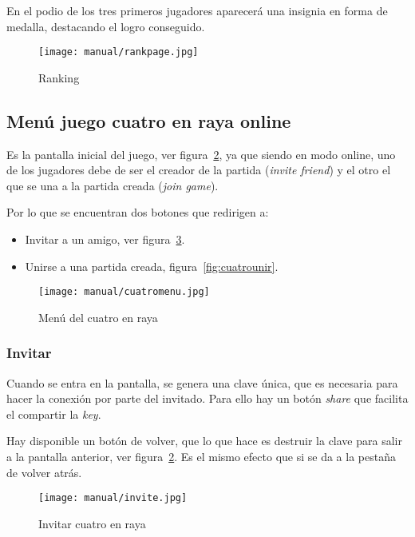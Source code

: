 En el podio de los tres primeros jugadores aparecerá una insignia en forma de medalla, destacando el logro conseguido.

\begin{figure}%
	\centering
	\texttt{[image: manual/rankpage.jpg]}
	\caption{Ranking}\label{fig:rankpage}
\end{figure}

\subsection{Menú juego cuatro en raya online}\label{cuatromenu}
Es la pantalla inicial del juego, ver figura~\ref{fig:cuatromenu}, ya que siendo en modo online, uno de los jugadores debe de ser el creador de la  partida (\emph{invite friend}) y el otro el que se una a la partida creada (\emph{join game}).

Por lo que se encuentran dos botones que redirigen a:
\begin{itemize}
	\item Invitar a un amigo, ver figura~\ref{fig:cuatroinvitar}.
	\item Unirse a una partida creada, figura~\ref{fig:cuatrounir}.
\end{itemize}

\begin{figure}%
	\centering
	\texttt{[image: manual/cuatromenu.jpg]}
	\caption{Menú del cuatro en raya}\label{fig:cuatromenu}
\end{figure}

\subsubsection{Invitar}\label{cuatroinvitar}
Cuando se entra en la pantalla, se genera una clave única, que es necesaria para hacer la conexión por parte del invitado. Para ello hay un botón \emph{share} que facilita el compartir la \emph{key}.

Hay disponible un botón de volver, que lo que hace es destruir la clave para salir a la pantalla anterior, ver figura~\ref{fig:cuatromenu}. Es el mismo efecto que si se da a la pestaña de volver atrás.


\begin{figure}%
	\centering
	\texttt{[image: manual/invite.jpg]}
	\caption{Invitar cuatro en raya}\label{fig:cuatroinvitar}
\end{figure}

